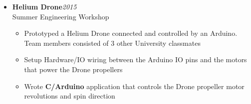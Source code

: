 \begin{itemize}[leftmargin=0pt, label={}]
\item{
{\sectionheading\large{\textbf{Helium Drone}}}\hfill {\sectionheading\small{\textit{2015}}}\\
{\sectionheading\small{Summer Engineering Workshop}}\hfill

    \vspace{-6pt}
    \begin{itemize}[label=\textbullet, leftmargin=*, noitemsep]%
        \item{Prototyped a Helium Drone connected and controlled by an Arduino. Team members consisted of 3 other University classmates}
        \item{Setup Hardware/IO wiring between the Arduino IO pins and the motors that power the Drone propellers}
        \item{Wrote \textbf{C/Arduino} application that controls the Drone propeller motor revolutions and spin direction}
    \end{itemize}
}
\end{itemize}
